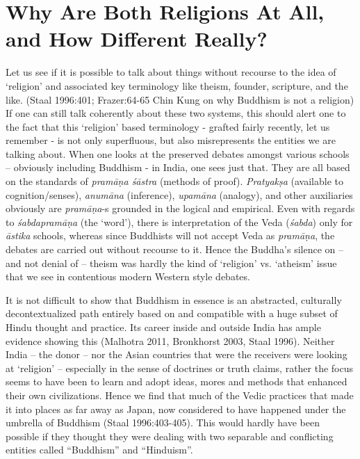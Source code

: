 \section*{Why Are Both Religions At All, and How Different Really?}

Let us see if it is possible to talk about things without recourse to the idea of ‘religion’ and associated key terminology like theism, founder, scripture, and the like. (Staal 1996:401; Frazer:64-65 Chin Kung on why Buddhism is not a religion) If one can still talk coherently about these two systems, this should alert one to the fact that this ‘religion’ based terminology - grafted fairly recently, let us remember - is not only superfluous, but also misrepresents the entities we are talking about. When one looks at the preserved debates amongst various schools – obviously including Buddhism - in India, one sees just that. They are all based on the standards of \textit{pramāṇa śāstra} (methods of proof). \textit{Pratyakṣa} (available to cognition/senses), \textit{anumāna} (inference), \textit{upamāna} (analogy), and other auxiliaries obviously are \textit{pramāṇa}-s grounded in the logical and empirical. Even with regards to \textit{śabdapramāṇa} (the ‘word’), there is interpretation of the Veda (\textit{śabda}) only for \textit{āstika} schools, whereas since Buddhists will not accept Veda as \textit{pramāṇa}, the debates are carried out without recourse to it. Hence the Buddha’s silence on – and not denial of – theism was hardly the kind of ‘religion’ vs. ‘atheism’ issue that we see in contentious modern Western style debates.

It is not difficult to show that Buddhism in essence is an abstracted, culturally decontextualized path entirely based on and compatible with a huge subset of Hindu thought and practice. Its career inside and outside India has ample evidence showing this (Malhotra 2011, Bronkhorst 2003, Staal 1996). Neither India – the donor – nor the Asian countries that were the receivers were looking at ‘religion’ – especially in the sense of doctrines or truth claims, rather the focus seems to have been to learn and adopt ideas, mores and methods that enhanced their own civilizations. Hence we find that much of the Vedic practices that made it into places as far away as Japan, now considered to have happened under the umbrella of Buddhism (Staal 1996:403-405). This would hardly have been possible if they thought they were dealing with two separable and conflicting entities called “Buddhism” and “Hinduism”.

